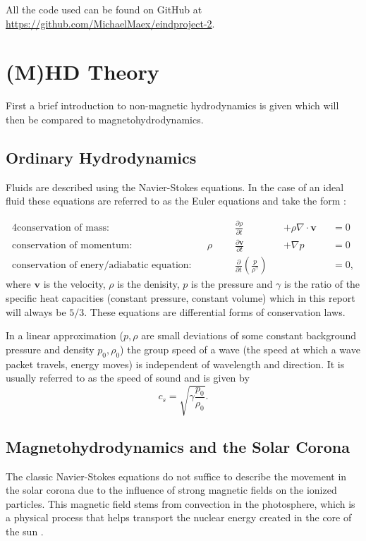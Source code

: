 \documentclass[a4paper]{article}
\numberwithin{figure}{section}
\numberwithin{equation}{section}
\begin{document}
All the code used can be found on GitHub at \url{https://github.com/MichaelMaex/eindproject-2}.
\pagebreak
\section{(M)HD Theory} \label{sec:(m)hd_theory}

First a brief introduction to non-magnetic hydrodynamics is given which will then be compared to magnetohydrodynamics.

\subsection{Ordinary Hydrodynamics} \label{sec:ordinary_hydrodynamics}

Fluids are described using the Navier-Stokes equations. In the case of an ideal fluid these equations are referred to as the Euler equations and take the form \cite[section 1.3]{acheson1990}:

\begin{alignat*}{4}
	\text{conservation of mass:}& &\quad\quad &\frac{\partial \rho}{\partial t} & &+ \rho \nabla \cdot \mathbf v & &=  0 \\
	\text{conservation of momentum:}& & \rho& \frac{\partial \mathbf v}{\partial t} & &+ \nabla p & &= 0\\
	\text{conservation of enery/adiabatic equation:}& & &\frac{\partial }{\partial t} \left( \frac{p}{\rho^{\gamma}} \right)  & & & &= 0
,\end{alignat*}
where $\mathbf v$ is the velocity,  $\rho$ is the denisity, $p$ is the pressure and $\gamma$ is the ratio of the specific heat capacities (constant pressure, constant volume) which in this report will always be $5 / 3$. 
These equations are differential forms of conservation laws. 

In a linear approximation ($p, \rho$ are small deviations of some constant background pressure and density $p_0, \rho_0$) the group speed of a wave (the speed at which a wave packet travels, energy moves) is independent of wavelength and direction. It is usually referred to as the speed of sound and is given by \cite[section 3.6]{acheson1990} \[
c_s = \sqrt{\gamma \frac{p_0}{\rho_0}} 
.\] 

\subsection{Magnetohydrodynamics and the Solar Corona} \label{sec:magnetohydrodynamics_and_the_solar_corona}
The classic Navier-Stokes equations do not suffice to describe the movement in the solar corona due to the influence of strong magnetic fields on the ionized particles. 
This magnetic field stems from convection in the photosphere, which is a physical process that helps transport the nuclear energy created in the core of the sun \cite{brun2017magnetism}.
\end{document}
